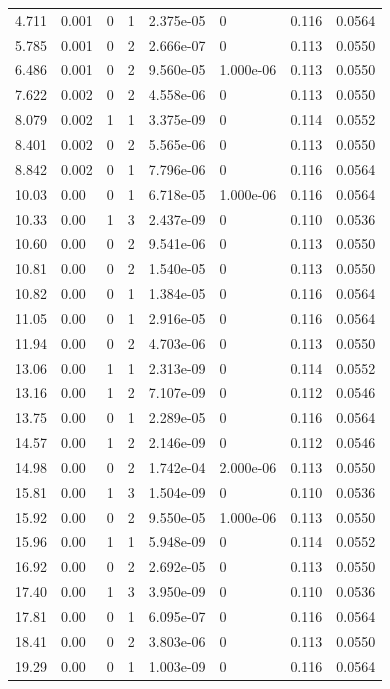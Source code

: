 \documentclass[preview]{standalone}
\begin{document}
{{\begin{tabular}{L{1.2cm}C{1.2cm} C{0.3cm}C{0.5cm} C{1.4cm}C{1.4cm} C{1.4cm}C{1.4cm}}
  4.711  &  0.001  & 0     &  1 &  2.375e-05  & 0  & 0.116 &  0.0564   \\ 
  5.785  &  0.001  & 0     &  2 &  2.666e-07  & 0  & 0.113 &  0.0550   \\ 
  6.486  &  0.001  & 0     &  2 &  9.560e-05  & 1.000e-06  & 0.113 &  0.0550   \\ 
  7.622  &  0.002  & 0     &  2 &  4.558e-06  & 0  & 0.113 &  0.0550   \\ 
  8.079  &  0.002  & 1     &  1 &  3.375e-09  & 0  & 0.114 &  0.0552   \\ 
  8.401  &  0.002  & 0     &  2 &  5.565e-06  & 0  & 0.113 &  0.0550   \\ 
  8.842  &  0.002  & 0     &  1 &  7.796e-06  & 0  & 0.116 &  0.0564   \\ 
  10.03  &  0.00  & 0     &  1 &  6.718e-05  & 1.000e-06  & 0.116 &  0.0564   \\ 
  10.33  &  0.00  & 1     &  3 &  2.437e-09  & 0  & 0.110 &  0.0536   \\ 
  10.60  &  0.00  & 0     &  2 &  9.541e-06  & 0  & 0.113 &  0.0550   \\ 
  10.81  &  0.00  & 0     &  2 &  1.540e-05  & 0  & 0.113 &  0.0550   \\ 
  10.82  &  0.00  & 0     &  1 &  1.384e-05  & 0  & 0.116 &  0.0564   \\ 
  11.05  &  0.00  & 0     &  1 &  2.916e-05  & 0  & 0.116 &  0.0564   \\ 
  11.94  &  0.00  & 0     &  2 &  4.703e-06  & 0  & 0.113 &  0.0550   \\ 
  13.06  &  0.00  & 1     &  1 &  2.313e-09  & 0  & 0.114 &  0.0552   \\ 
  13.16  &  0.00  & 1     &  2 &  7.107e-09  & 0  & 0.112 &  0.0546   \\ 
  13.75  &  0.00  & 0     &  1 &  2.289e-05  & 0  & 0.116 &  0.0564   \\ 
  14.57  &  0.00  & 1     &  2 &  2.146e-09  & 0  & 0.112 &  0.0546   \\ 
  14.98  &  0.00  & 0     &  2 &  1.742e-04  & 2.000e-06  & 0.113 &  0.0550   \\ 
  15.81  &  0.00  & 1     &  3 &  1.504e-09  & 0  & 0.110 &  0.0536   \\ 
  15.92  &  0.00  & 0     &  2 &  9.550e-05  & 1.000e-06  & 0.113 &  0.0550   \\ 
  15.96  &  0.00  & 1     &  1 &  5.948e-09  & 0  & 0.114 &  0.0552   \\ 
  16.92  &  0.00  & 0     &  2 &  2.692e-05  & 0  & 0.113 &  0.0550   \\ 
  17.40  &  0.00  & 1     &  3 &  3.950e-09  & 0  & 0.110 &  0.0536   \\ 
  17.81  &  0.00  & 0     &  1 &  6.095e-07  & 0  & 0.116 &  0.0564   \\ 
  18.41  &  0.00  & 0     &  2 &  3.803e-06  & 0  & 0.113 &  0.0550   \\ 
  19.29  &  0.00  & 0     &  1 &  1.003e-09  & 0  & 0.116 &  0.0564   \\ 
\hline 
\end{tabular} 

}}
\end{document}
